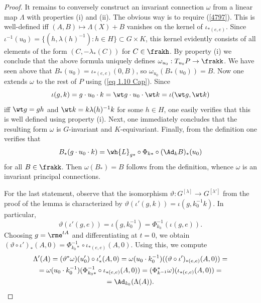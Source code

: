 \begin{proof}
    It remains to conversely construct an invariant connection $\omega$ from a linear map $\Lambda$ with properties (i) and (ii). The obvious way is to require (\ref{4797}). This is well-defined iff $(A,B)\mapsto \Lambda(X)+B$ vanishes on the kernel of $\iota_{\ast(e,e)}$. Since $\iota^{-1}(u_0)=\{(h,\lambda(h)^{-1}):h\in H\}\subset G\times K$, this kernel evidently consists of all elements of the form $(C,-\lambda_\ast(C))$ for $C\in \frakh$. By property (i) we conclude that the above formula uniquely defines $\omega_{u_0}:T_{u_0}P\to \frakk$. We have seen above that $B_\ast(u_0)=\iota_{\ast(e,e)}(0,B)$, so $\omega_{u_0}(B_\ast(u_0))=B$. Now one extends $\omega$ to the rest of $P$ using (\ref{eq 1.10 Cap}). Since 
    \[\iota(g,k)=g\cdot u_0\cdot k=\wt g\cdot u_0\cdot \wt k=\iota(\wt g,\wt k)\]
    iff $\wt g=gh$ and $\wt k =k\lambda(h)^{-1}k$ for some $h\in H$, one easily verifies that this is well defined using property (i). Next, one immediately concludes that the resulting form $\omega$ is $G$-invariant and $K$-equivariant. Finally, from the definition one verifies that 
    \[B_\ast(g\cdot u_0\cdot k)=\wh{L}_{g\ast}\circ \Phi_{k\ast}\circ (\Ad_k B)_\ast(u_0)\]
    for all $B\in\frakk$. Then $\omega(B_\ast)=B$ follows from the definition, whence $\omega$ is an invariant principal connections.

    For the last statement, observe that the isomorphism $\vartheta:G^{[\lambda]}\to G^{[\lambda']}$ from the proof of the lemma is characterized by $\vartheta(\iota'(g,k))=\iota(g,k_0^{-1}k)$. In particular, 
    \[\vartheta(\iota'(g,e))=\iota(g,k_0^{-1})=\Phi_{k_0}^{-1}(\iota(g,e)).\]
    Choosing $g=\rme^{tA}$ and differentiating at $t=0$, we obtain $(\vartheta\circ \iota')_\ast(A,0)=\Phi_{k_0\ast}^{-1}\circ \iota_{\ast(e,e)}(A,0)$. Using this, we compute 
    \begin{multline}
        \Lambda'(A)=(\vartheta^\ast \omega)(u_0')\circ \iota'_\ast(A,0)=\omega(u_0\cdot k_0^{-1})((\vartheta\circ \iota')_{\ast(e,e)}(A,0))=\\
        =\omega(u_0\cdot k_0^{-1})(\Phi_{k_0\ast}^{-1}\circ \iota_{\ast(e,e)}(A,0))=(\Phi_{k^{-1}}^\ast\omega)(\iota_{\ast(e,e)}(A,0))=\\
        =\Ad_{k_0}(\Lambda(A)).
    \end{multline}
\end{proof}

